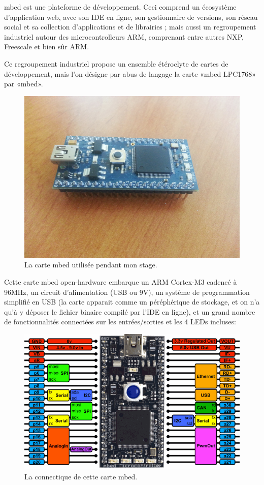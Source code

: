 \documentclass{article}
\begin{document}
mbed est une plateforme de développement. Ceci comprend un écosystème d’application web, avec son IDE en ligne, son gestionnaire de versions, son réseau social et sa collection d’applications et de librairies ; mais aussi un regroupement industriel autour des microcontrolleurs ARM, comprenant entre autres NXP, Freescale et bien sûr ARM.

Ce regroupement industriel propose un ensemble étéroclyte de cartes de développement, mais l’on désigne par abus de langage la carte «mbed LPC1768» par «mbed».

\begin{figure}[h!]
    \centering\includegraphics[width=\linewidth*2/3]{img/mbed.jpg}
    \caption{La carte mbed utilisée pendant mon stage.}
\end{figure}

Cette carte mbed open-hardware embarque un ARM Cortex-M3 cadencé à 96MHz, un circuit d’alimentation (USB ou 9V), un système de programmation simplifié en USB (la carte apparait comme un péréphérique de stockage, et on n’a qu’à y déposer le fichier binaire compilé par l’IDE en ligne), et un grand nombre de fonctionnalités connectées sur les entrées/sorties et les 4 LEDs incluses:

\begin{figure}[h!]
    \centering\includegraphics[width=\linewidth*3/4]{img/pinout.png}
    \caption{La connectique de cette carte mbed.}
\end{figure}
\end{document}
